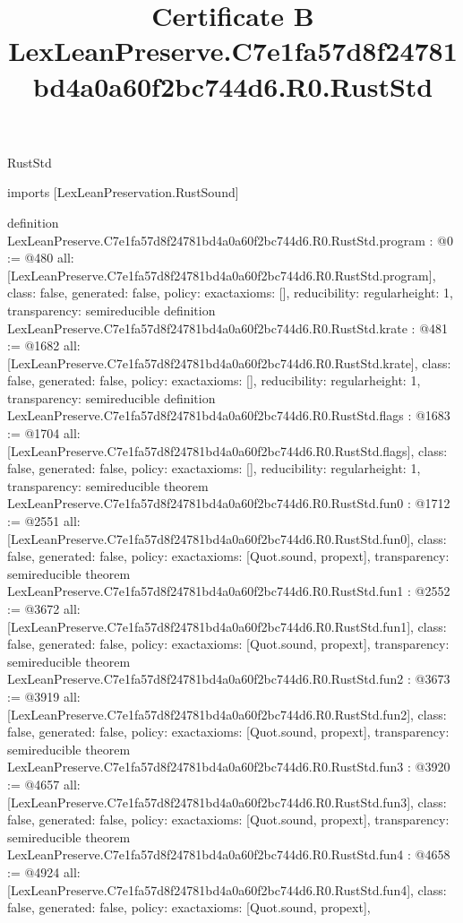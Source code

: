 \begin{lexlean}{RustStd}
\title{Certificate B LexLeanPreserve.C7e1fa57d8f24781bd4a0a60f2bc744d6.R0.RustStd}
\begin{coremodule}
imports [LexLeanPreservation.RustSound]

definition LexLeanPreserve.C7e1fa57d8f24781bd4a0a60f2bc744d6.R0.RustStd.program : @0 := @480 {
  all: [LexLeanPreserve.C7e1fa57d8f24781bd4a0a60f2bc744d6.R0.RustStd.program],
  class: false,
  generated: false,
  policy: exact{axioms: []},
  reducibility: regular{height: 1},
  transparency: semireducible
}
definition LexLeanPreserve.C7e1fa57d8f24781bd4a0a60f2bc744d6.R0.RustStd.krate : @481 := @1682 {
  all: [LexLeanPreserve.C7e1fa57d8f24781bd4a0a60f2bc744d6.R0.RustStd.krate],
  class: false,
  generated: false,
  policy: exact{axioms: []},
  reducibility: regular{height: 1},
  transparency: semireducible
}
definition LexLeanPreserve.C7e1fa57d8f24781bd4a0a60f2bc744d6.R0.RustStd.flags : @1683 := @1704 {
  all: [LexLeanPreserve.C7e1fa57d8f24781bd4a0a60f2bc744d6.R0.RustStd.flags],
  class: false,
  generated: false,
  policy: exact{axioms: []},
  reducibility: regular{height: 1},
  transparency: semireducible
}
theorem LexLeanPreserve.C7e1fa57d8f24781bd4a0a60f2bc744d6.R0.RustStd.fun0 : @1712 := @2551 {
  all: [LexLeanPreserve.C7e1fa57d8f24781bd4a0a60f2bc744d6.R0.RustStd.fun0],
  class: false,
  generated: false,
  policy: exact{axioms: [Quot.sound, propext]},
  transparency: semireducible
}
theorem LexLeanPreserve.C7e1fa57d8f24781bd4a0a60f2bc744d6.R0.RustStd.fun1 : @2552 := @3672 {
  all: [LexLeanPreserve.C7e1fa57d8f24781bd4a0a60f2bc744d6.R0.RustStd.fun1],
  class: false,
  generated: false,
  policy: exact{axioms: [Quot.sound, propext]},
  transparency: semireducible
}
theorem LexLeanPreserve.C7e1fa57d8f24781bd4a0a60f2bc744d6.R0.RustStd.fun2 : @3673 := @3919 {
  all: [LexLeanPreserve.C7e1fa57d8f24781bd4a0a60f2bc744d6.R0.RustStd.fun2],
  class: false,
  generated: false,
  policy: exact{axioms: [Quot.sound, propext]},
  transparency: semireducible
}
theorem LexLeanPreserve.C7e1fa57d8f24781bd4a0a60f2bc744d6.R0.RustStd.fun3 : @3920 := @4657 {
  all: [LexLeanPreserve.C7e1fa57d8f24781bd4a0a60f2bc744d6.R0.RustStd.fun3],
  class: false,
  generated: false,
  policy: exact{axioms: [Quot.sound, propext]},
  transparency: semireducible
}
theorem LexLeanPreserve.C7e1fa57d8f24781bd4a0a60f2bc744d6.R0.RustStd.fun4 : @4658 := @4924 {
  all: [LexLeanPreserve.C7e1fa57d8f24781bd4a0a60f2bc744d6.R0.RustStd.fun4],
  class: false,
  generated: false,
  policy: exact{axioms: [Quot.sound, propext]},
}
\end{coremodule}
\end{lexlean}
